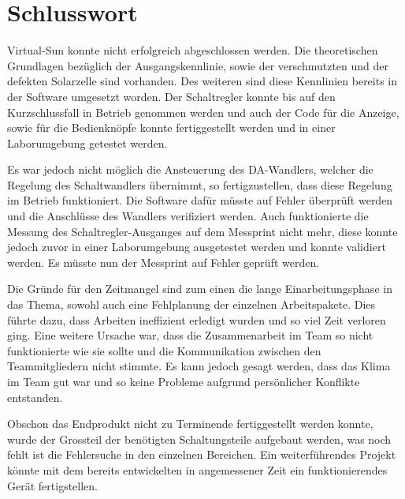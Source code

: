 %
%
\section{Schlusswort}

Virtual-Sun konnte nicht erfolgreich abgeschlossen werden. Die theoretischen Grundlagen bezüglich der Ausgangskennlinie, sowie der verschmutzten und der defekten Solarzelle sind vorhanden. Des weiteren sind diese Kennlinien bereits in der Software umgesetzt worden. Der Schaltregler konnte bis auf den Kurzschlussfall in Betrieb genommen werden und auch der Code für die Anzeige, sowie für die Bedienknöpfe konnte fertiggestellt werden und in einer Laborumgebung getestet werden. 

Es war jedoch nicht möglich die Ansteuerung des DA-Wandlers, welcher die Regelung des Schaltwandlers übernimmt, so fertigzustellen, dass diese Regelung im Betrieb funktioniert. Die Software dafür müsste auf Fehler überprüft werden und die Anschlüsse des Wandlers verifiziert werden. Auch funktionierte die Messung des Schaltregler-Ausganges auf dem Messprint nicht mehr, diese konnte jedoch zuvor in einer Laborumgebung ausgetestet werden und konnte validiert werden. Es müsste nun der Messprint auf Fehler geprüft werden.



Die Gründe für den Zeitmangel sind zum einen die lange Einarbeitungsphase in das Thema, sowohl auch eine Fehlplanung der einzelnen Arbeitspakete. Dies führte dazu, dass Arbeiten ineffizient erledigt wurden und so viel Zeit verloren ging. Eine weitere Ursache war, dass die Zusammenarbeit im Team so nicht funktionierte wie sie sollte und die Kommunikation zwischen den Teammitgliedern nicht stimmte. Es kann jedoch gesagt werden, dass das Klima im Team gut war und so keine Probleme aufgrund persönlicher Konflikte entstanden. 

Obschon das Endprodukt nicht zu Terminende fertiggestellt werden konnte, wurde der Grossteil der benötigten Schaltungsteile aufgebaut werden, was noch fehlt ist die Fehlersuche in den einzelnen Bereichen. Ein weiterführendes Projekt könnte mit dem bereits entwickelten in angemessener Zeit ein funktionierendes Gerät fertigstellen.

%
